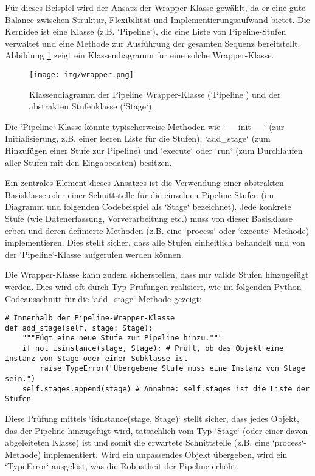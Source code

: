 \documentclass[a4paper]{article} %
\begin{document}
Für dieses Beispiel wird der Ansatz der Wrapper-Klasse gewählt, da er eine gute Balance zwischen Struktur, Flexibilität und Implementierungsaufwand bietet. Die Kernidee ist eine Klasse (z.B. `Pipeline`), die eine Liste von Pipeline-Stufen verwaltet und eine Methode zur Ausführung der gesamten Sequenz bereitstellt. Abbildung \ref{fig:wrapper} zeigt ein Klassendiagramm für eine solche Wrapper-Klasse.

\begin{figure}[htbp]
    \centering
    \texttt{[image: img/wrapper.png]}
    \caption{Klassendiagramm der Pipeline Wrapper-Klasse (`Pipeline`) und der abstrakten Stufenklasse (`Stage`).}
    \label{fig:wrapper}
\end{figure}

Die `Pipeline`-Klasse könnte typischerweise Methoden wie `\_\_init\_\_` (zur Initialisierung, z.B. einer leeren Liste für die Stufen), `add\_stage` (zum Hinzufügen einer Stufe zur Pipeline) und `execute` oder `run` (zum Durchlaufen aller Stufen mit den Eingabedaten) besitzen.

Ein zentrales Element dieses Ansatzes ist die Verwendung einer abstrakten Basisklasse oder einer Schnittstelle für die einzelnen Pipeline-Stufen (im Diagramm und folgenden Codebeispiel als `Stage` bezeichnet). Jede konkrete Stufe (wie Datenerfassung, Vorverarbeitung etc.) muss von dieser Basisklasse erben und deren definierte Methoden (z.B. eine `process` oder `execute`-Methode) implementieren. Dies stellt sicher, dass alle Stufen einheitlich behandelt und von der `Pipeline`-Klasse aufgerufen werden können.

Die Wrapper-Klasse kann zudem sicherstellen, dass nur valide Stufen hinzugefügt werden. Dies wird oft durch Typ-Prüfungen realisiert, wie im folgenden Python-Codeausschnitt für die `add_stage`-Methode gezeigt:

\begin{verbatim}
# Innerhalb der Pipeline-Wrapper-Klasse
def add_stage(self, stage: Stage):
    """Fügt eine neue Stufe zur Pipeline hinzu."""
    if not isinstance(stage, Stage): # Prüft, ob das Objekt eine Instanz von Stage oder einer Subklasse ist
        raise TypeError("Übergebene Stufe muss eine Instanz von Stage sein.")
    self.stages.append(stage) # Annahme: self.stages ist die Liste der Stufen
\end{verbatim}

Diese Prüfung mittels `isinstance(stage, Stage)` stellt sicher, dass jedes Objekt, das der Pipeline hinzugefügt wird, tatsächlich vom Typ `Stage` (oder einer davon abgeleiteten Klasse) ist und somit die erwartete Schnittstelle (z.B. eine `process`-Methode) implementiert. Wird ein unpassendes Objekt übergeben, wird ein `TypeError` ausgelöst, was die Robustheit der Pipeline erhöht.
\end{document}

